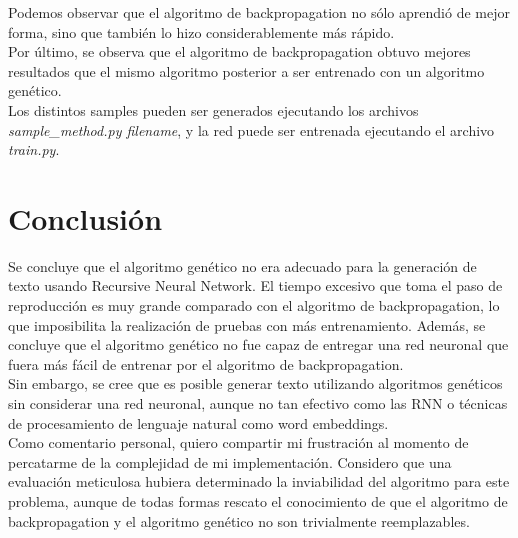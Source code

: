 \documentclass[11pt,letterpaper]{article}
\begin{document}
Podemos observar que el algoritmo de backpropagation no sólo aprendió de mejor forma, sino que también lo 
hizo considerablemente más rápido.\\

Por último, se observa que el algoritmo de backpropagation obtuvo mejores resultados que el mismo algoritmo 
posterior a ser entrenado con un algoritmo genético.\\

Los distintos samples pueden ser generados ejecutando los archivos 
\textit{sample\_method.py filename}, y la red puede ser entrenada ejecutando el archivo \textit{train.py}.

\section{Conclusión}
Se concluye que el algoritmo genético no era adecuado para la generación de texto usando Recursive Neural 
Network. El tiempo excesivo que toma el paso de reproducción es muy grande comparado con el algoritmo de 
backpropagation, lo que imposibilita la realización de pruebas con más entrenamiento. Además, se concluye 
que el algoritmo genético no fue capaz de entregar una red neuronal que fuera más fácil de entrenar 
por el algoritmo de backpropagation.\\

Sin embargo, se cree que es posible generar texto utilizando algoritmos genéticos sin considerar una 
red neuronal, aunque no tan efectivo como las RNN o técnicas de procesamiento de lenguaje natural 
como word embeddings.\\

Como comentario personal, quiero compartir mi frustración al momento de percatarme de la complejidad de 
mi implementación. Considero que una evaluación meticulosa hubiera determinado la inviabilidad del 
algoritmo para este problema, aunque de todas formas rescato el conocimiento de que el algoritmo 
de backpropagation y el algoritmo genético no son trivialmente reemplazables.


\end{document}
